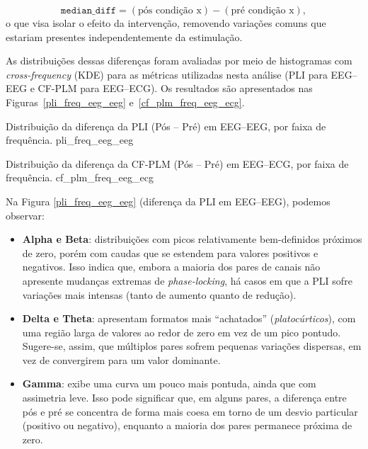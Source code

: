 \[
\texttt{median\_diff} = (\text{pós condição x}) - (\text{pré condição x}),
\]
o que visa isolar o efeito da intervenção, removendo variações comuns que estariam presentes independentemente da estimulação.

As distribuições dessas diferenças foram avaliadas por meio de histogramas com \textit{cross-frequency} (KDE) para as métricas utilizadas nesta análise (PLI para EEG--EEG e CF-PLM para EEG--ECG). Os resultados são apresentados nas Figuras~\ref{pli_freq_eeg_eeg} e~\ref{cf_plm_freq_eeg_ecg}.

{Distribuição da diferença da PLI (Pós -- Pré) em EEG--EEG, por faixa de frequência.}
{pli_freq_eeg_eeg}

{Distribuição da diferença da CF-PLM (Pós -- Pré) em EEG--ECG, por faixa de frequência.}
{cf_plm_freq_eeg_ecg}

Na Figura \ref{pli_freq_eeg_eeg} (diferença da PLI em EEG--EEG), podemos observar:
\begin{itemize}
    \item \textbf{Alpha e Beta}: distribuições com picos relativamente bem-definidos próximos de zero, porém com caudas que se estendem para valores positivos e negativos. Isso indica que, embora a maioria dos pares de canais não apresente mudanças extremas de \emph{phase-locking}, há casos em que a PLI sofre variações mais intensas (tanto de aumento quanto de redução).
    \item \textbf{Delta e Theta}: apresentam formatos mais “achatados” (\emph{platocúrticos}), com uma região larga de valores ao redor de zero em vez de um pico pontudo. Sugere-se, assim, que múltiplos pares sofrem pequenas variações dispersas, em vez de convergirem para um valor dominante.
    \item \textbf{Gamma}: exibe uma curva um pouco mais pontuda, ainda que com assimetria leve. Isso pode significar que, em alguns pares, a diferença entre pós e pré se concentra de forma mais coesa em torno de um desvio particular (positivo ou negativo), enquanto a maioria dos pares permanece próxima de zero.
\end{itemize}

